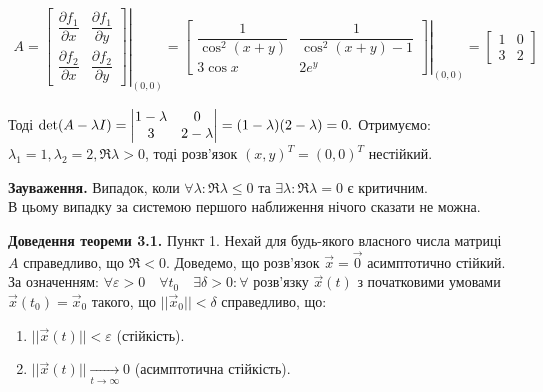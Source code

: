 \documentclass[14pt,a4paper]{scrartcl}
\theoremstyle{definition}
\theoremstyle{definition}
\theoremstyle{definition}
\begin{document}
\begin{spacing}{2.5}
\begin{gather*}
  A = \left. \begin{bmatrix}
    \dfrac{\partial f_1}{\partial x}   &   \dfrac{\partial f_1}{\partial y} \\
    \dfrac{\partial f_2}{\partial x}   &   \dfrac{\partial f_2}{\partial y}
  \end{bmatrix} \right|_{(0,0)}  =
  \left.\begin{bmatrix}
     \dfrac{1}{\cos^2(x+y)} & \dfrac{1}{\cos^2(x+y) - 1} \\
    3 \cos x & 2e^y
  \end{bmatrix} \right|_{(0,0)}  =
  \begin{bmatrix}
    1 & 0 \\
    3 & 2
  \end{bmatrix}
\end{gather*}
\end{spacing}

Тоді $\det(A - \lambda I) =  \begin{vmatrix} 1 - \lambda & 0 \\ 3 & 2 - \lambda \end{vmatrix} = (1 - \lambda)(2 - \lambda) = 0. \\ $ Отримуємо: $\lambda_1 = 1,  \lambda_2 = 2,  \Re \lambda > 0$, тоді розв'язок $(x, y)^T = (0, 0)^T $ нестійкий.

\textbf{Зауваження. } Випадок, коли $\forall \lambda : \Re \lambda \leq 0$ та $\exists \lambda : \Re \lambda = 0$ є критичним. \\ В цьому випадку за системою першого наближення нічого сказати не можна.

\textbf{Доведення теореми 3.1. } Пункт 1. Нехай для будь-якого власного числа матриці $A$ справедливо, що $\Re < 0$. Доведемо, що розв'язок $\overrightarrow{x} = \overrightarrow{0}$ асимптотично стійкий. За означенням: $\forall \varepsilon > 0 \quad \forall t_0 \quad \exists \delta > 0 : \forall$ розв'язку $\overrightarrow{x}(t)$ з початковими умовами $\overrightarrow{x}(t_0) = \overrightarrow{x}_0$ такого, що $||\overrightarrow{x}_0|| < \delta$ справедливо, що:
\begin{enumerate}
  \item $||\overrightarrow{x}(t)|| < \varepsilon$ (стійкість).
  \item $||\overrightarrow{x}(t)|| \xrightarrow[t \to \infty]{} 0$ (асимптотична стійкість).
\end{enumerate}
\end{document}
